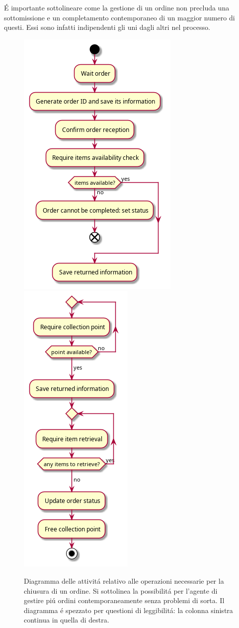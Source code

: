 \'E importante sottolineare come la gestione di un ordine non precluda una sottomissione e un completamento contemporaneo di un maggior numero di questi. Essi sono infatti indipendenti gli uni dagli altri nel processo.
\begin{figure}[!ht]\centering
    \includegraphics[width=.45\textwidth]{section/design/figure/order_manager/activity_diagram-1.png}
    \includegraphics[width=.45\textwidth]{section/design/figure/order_manager/activity_diagram-2.png}
    \caption{Diagramma delle attivit\'a relativo alle operazioni necessarie per la chiusura di un ordine. Si sottolinea la possibilit\'a per l'agente di gestire pi\'u ordini contemporaneamente senza problemi di sorta. Il diagramma \'e spezzato per questioni di leggibilit\'a: la colonna sinistra continua in quella di destra.}
    \label{fig:order-managet-activity-diagram}
\end{figure}

